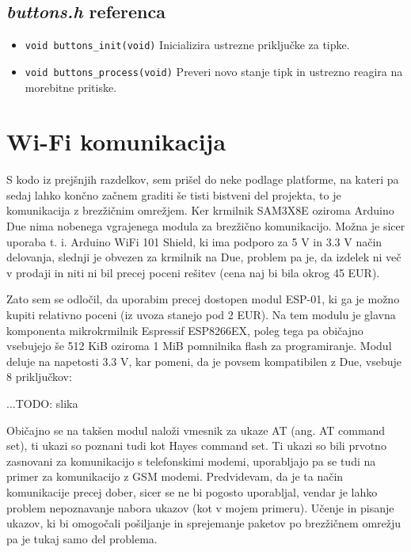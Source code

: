 \documentclass[12pt,a4paper,twoside,openright,slovene]{book}
\begin{document}
\subsection{\textit{buttons.h} referenca}

\begin{itemize}
	\item[] \lstinline{void buttons_init(void)}\newline
		Inicializira ustrezne priključke za tipke.
	\item[] \lstinline{void buttons_process(void)}\newline
		Preveri novo stanje tipk in ustrezno reagira na morebitne pritiske.
\end{itemize}



\section{Wi-Fi komunikacija}

S kodo iz prejšnjih razdelkov, sem prišel do neke podlage platforme, na kateri pa sedaj lahko končno začnem graditi še tisti bistveni del projekta, to je komunikacija z brezžičnim omrežjem. Ker krmilnik SAM3X8E oziroma Arduino Due nima nobenega vgrajenega modula za brezžično komunikacijo. Možna je sicer uporaba t. i. Arduino WiFi 101 Shield, ki ima podporo za 5 V in 3.3 V način delovanja, slednji je obvezen za krmilnik na Due, problem pa je, da izdelek ni več v prodaji in niti ni bil precej poceni rešitev (cena naj bi bila okrog 45 EUR).

Zato sem se odločil, da uporabim precej dostopen modul ESP-01, ki ga je možno kupiti relativno poceni (iz uvoza stanejo pod 2 EUR). Na tem modulu je glavna komponenta mikrokrmilnik Espressif ESP8266EX, poleg tega pa običajno vsebujejo še 512 KiB oziroma 1 MiB pomnilnika flash za programiranje. Modul deluje na napetosti 3.3 V, kar pomeni, da je povsem kompatibilen z Due, vsebuje 8 priključkov:

...TODO: slika

Običajno se na takšen modul naloži vmesnik za ukaze AT (ang. AT command set), ti ukazi so poznani tudi kot Hayes command set. Ti ukazi so bili prvotno zasnovani za komunikacijo s telefonskimi modemi, uporabljajo pa se tudi na primer za komunikacijo z GSM modemi. Predvidevam, da je ta način komunikacije precej dober, sicer se ne bi pogosto uporabljal, vendar je lahko problem nepoznavanje nabora ukazov (kot v mojem primeru). Učenje in pisanje ukazov, ki bi omogočali pošiljanje in sprejemanje paketov po brezžičnem omrežju pa je tukaj samo del problema.
\end{document}
